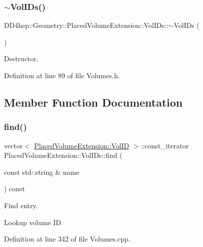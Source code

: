 \subsubsection{\texorpdfstring{$\sim$\+Vol\+I\+Ds()}{~VolIDs()}}
{\footnotesize\ttfamily D\+D4hep\+::\+Geometry\+::\+Placed\+Volume\+Extension\+::\+Vol\+I\+Ds\+::$\sim$\+Vol\+I\+Ds (\begin{DoxyParamCaption}{ }\end{DoxyParamCaption})\hspace{0.3cm}{\ttfamily [inline]}}



Destructor. 



Definition at line 89 of file Volumes.\+h.



\subsection{Member Function Documentation}
\hypertarget{class_d_d4hep_1_1_geometry_1_1_placed_volume_extension_1_1_vol_i_ds_a858e0760f9968c77969014aa150c2933}{}\label{class_d_d4hep_1_1_geometry_1_1_placed_volume_extension_1_1_vol_i_ds_a858e0760f9968c77969014aa150c2933} 
\subsubsection{\texorpdfstring{find()}{find()}}
{\footnotesize\ttfamily vector$<$ \hyperlink{class_d_d4hep_1_1_geometry_1_1_placed_volume_extension_a9f0e95dedfbda206b118af985b2ed473}{Placed\+Volume\+Extension\+::\+Vol\+ID} $>$\+::const\+\_\+iterator Placed\+Volume\+Extension\+::\+Vol\+I\+Ds\+::find (\begin{DoxyParamCaption}\item[{const std\+::string \&}]{name }\end{DoxyParamCaption}) const}



Find entry. 

Lookup volume ID. 

Definition at line 342 of file Volumes.\+cpp.



